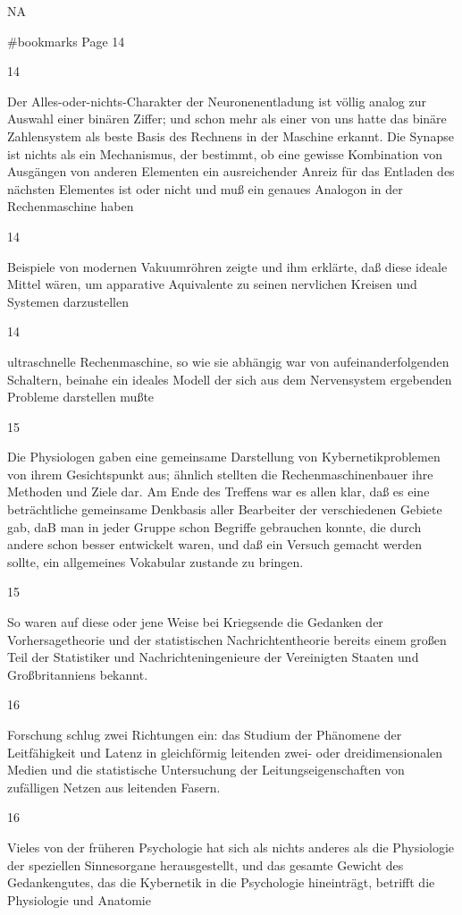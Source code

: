 \documentclass[
  letterpaper,
  DIV=11,
  numbers=noendperiod]{scrartcl}
\begin{document}
NA

\#bookmarks Page 14

14

Der Alles-oder-nichts-Charakter der Neuronenentladung ist völlig analog
zur Auswahl einer binären Ziffer; und schon mehr als einer von uns hatte
das binäre Zahlensystem als beste Basis des Rechnens in der Maschine
erkannt. Die Synapse ist nichts als ein Mechanismus, der bestimmt, ob
eine gewisse Kombination von Ausgängen von anderen Elementen ein
ausreichender Anreiz für das Entladen des nächsten Elementes ist oder
nicht und muß ein genaues Analogon in der Rechenmaschine haben

14

Beispiele von modernen Vakuumröhren zeigte und ihm erklärte, daß diese
ideale Mittel wären, um apparative Aquivalente zu seinen nervlichen
Kreisen und Systemen darzustellen

14

ultraschnelle Rechenmaschine, so wie sie abhängig war von
aufeinanderfolgenden Schaltern, beinahe ein ideales Modell der sich aus
dem Nervensystem ergebenden Probleme darstellen mußte

15

Die Physiologen gaben eine gemeinsame Darstellung von
Kybernetikproblemen von ihrem Gesichtspunkt aus; ähnlich stellten die
Rechenmaschinenbauer ihre Methoden und Ziele dar. Am Ende des Treffens
war es allen klar, daß es eine beträchtliche gemeinsame Denkbasis aller
Bearbeiter der verschiedenen Gebiete gab, daB man in jeder Gruppe schon
Begriffe gebrauchen konnte, die durch andere schon besser entwickelt
waren, und daß ein Versuch gemacht werden sollte, ein allgemeines
Vokabular zustande zu bringen.

15

So waren auf diese oder jene Weise bei Kriegsende die Gedanken der
Vorhersagetheorie und der statistischen Nachrichtentheorie bereits einem
großen Teil der Statistiker und Nachrichteningenieure der Vereinigten
Staaten und Großbritanniens bekannt.

16

Forschung schlug zwei Richtungen ein: das Studium der Phänomene der
Leitfähigkeit und Latenz in gleichförmig leitenden zwei- oder
dreidimensionalen Medien und die statistische Untersuchung der
Leitungseigenschaften von zufälligen Netzen aus leitenden Fasern.

16

Vieles von der früheren Psychologie hat sich als nichts anderes als die
Physiologie der speziellen Sinnesorgane herausgestellt, und das gesamte
Gewicht des Gedankengutes, das die Kybernetik in die Psychologie
hineinträgt, betrifft die Physiologie und Anatomie
\end{document}

